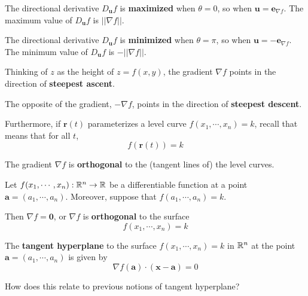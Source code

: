 \begin{proposition}
    The directional derivative $D_{\bm{u}} f$ is \textbf{maximized} when $\theta = 0$, so when $\bm{u} = \bm{e}_{\nabla f}$.  The maximum value of $D_{\bm{u}} f$ is $||\nabla f||$.

    
    The directional derivative $D_{\bm{u}} f$ is \textbf{minimized} when $\theta = \pi$, so when $\bm{u} = -\bm{e}_{\nabla f}$.  The minimum value of $D_{\bm{u}} f$ is $-||\nabla f||$.
    \end{proposition}
    
    \begin{example}
        Thinking of $z$ as the height of $z = f(x,y)$, the gradient $\nabla f$ points in the direction of \textbf{steepest ascent}.
    
    \vspace{1em}
    
    The opposite of the gradient, $-\nabla f$, points in the direction of \textbf{steepest descent}.
    \end{example}
    
    Furthermore, if $\bm{r}(t)$ parameterizes a level curve $f(x_1, \cdots, x_n) =k$, recall that means that for all $t$, $$f(\bm{r}(t)) = k$$
    
    
    \begin{proposition}
    The gradient $\nabla f$ is \textbf{orthogonal} to the (tangent lines of) the level curves.
    \end{proposition}







\begin{corollary}
    Let $f(x_1,\cdots,x_n) : \mathbb{R}^n \to \mathbb{R}$ be a differentiable function at a point $\bm{a} = (a_1,\cdots, a_n)$.  Moreover, suppose that $f(a_1,\cdots,a_n) = k$.  
    
    Then $\nabla f = \bm{0}$, or $\nabla f$ is \textbf{orthogonal} to the surface $$f(x_1,\cdots,x_n) = k$$
    \end{corollary}




\begin{corollary}
    The \textbf{tangent hyperplane} to the surface $f(x_1,\cdots,x_n) = k$ in $\mathbb{R}^n$ at the point $\bm{a} = (a_1,\cdots, a_n)$ is given by 
    $$\nabla f(\bm{a}) \cdot (\bm{x - a}) = 0$$
    \end{corollary}

\begin{motivating}
    How does this relate to previous notions of tangent hyperplane?
\end{motivating}
        
